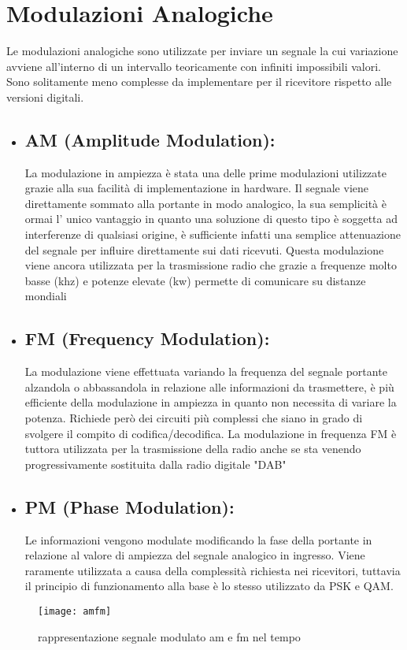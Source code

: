 \section{Modulazioni Analogiche}
Le modulazioni analogiche sono utilizzate per inviare un segnale la cui variazione avviene all'interno di un intervallo teoricamente con infiniti impossibili valori. Sono solitamente meno complesse da implementare per il ricevitore rispetto alle versioni digitali.
\label{sec:context}
\begin{itemize}
   	\item \subsection{AM (Amplitude Modulation): } La modulazione in ampiezza è stata una delle prime modulazioni utilizzate grazie alla sua facilità di implementazione in hardware. Il segnale viene direttamente sommato alla portante in modo analogico, la sua semplicità è ormai l' unico vantaggio in quanto una soluzione di questo tipo è soggetta ad interferenze di qualsiasi origine, è sufficiente infatti una semplice attenuazione del segnale per influire direttamente sui dati ricevuti. Questa modulazione viene ancora utilizzata per la trasmissione radio che grazie a frequenze molto basse (khz) e potenze elevate (kw) permette di comunicare su distanze mondiali
   \item \subsection{FM (Frequency Modulation): } La modulazione viene effettuata variando la frequenza del segnale portante alzandola o abbassandola in relazione alle informazioni da trasmettere, è più efficiente della modulazione in ampiezza in quanto non necessita di variare la potenza. Richiede però dei circuiti più complessi che siano in grado di svolgere il compito di codifica/decodifica. La modulazione in frequenza FM è tuttora utilizzata per la trasmissione della radio anche se sta venendo progressivamente sostituita dalla radio digitale "DAB"
   \item \subsection{PM (Phase Modulation): } Le informazioni vengono modulate modificando la fase della portante in relazione al valore di ampiezza del segnale analogico in ingresso. Viene raramente utilizzata a causa della complessità richiesta nei ricevitori, tuttavia il principio di funzionamento alla base è lo stesso utilizzato da PSK e QAM.
  \end{itemize}
  \begin{figure}[h]
  	\centering
  	\texttt{[image: amfm]}
  	\caption{rappresentazione segnale modulato am e fm nel tempo}\label{fig:1}
  \end{figure}





